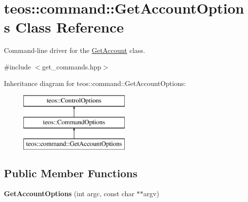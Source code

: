 \hypertarget{classteos_1_1command_1_1_get_account_options}{}\section{teos\+:\+:command\+:\+:Get\+Account\+Options Class Reference}
\label{classteos_1_1command_1_1_get_account_options}


Command-\/line driver for the \mbox{\hyperlink{classteos_1_1command_1_1_get_account}{Get\+Account}} class.  




{\ttfamily \#include $<$get\+\_\+commands.\+hpp$>$}

Inheritance diagram for teos\+:\+:command\+:\+:Get\+Account\+Options\+:\begin{figure}[H]
\begin{center}
\leavevmode
\includegraphics[height=3.000000cm]{classteos_1_1command_1_1_get_account_options}
\end{center}
\end{figure}
\subsection*{Public Member Functions}
\begin{DoxyCompactItemize}
\item 
\mbox{\label{classteos_1_1command_1_1_get_account_options_a8a932086b050c3446bd371293b7ea534}} 
{\bfseries Get\+Account\+Options} (int argc, const char $\ast$$\ast$argv)
\end{DoxyCompactItemize}
